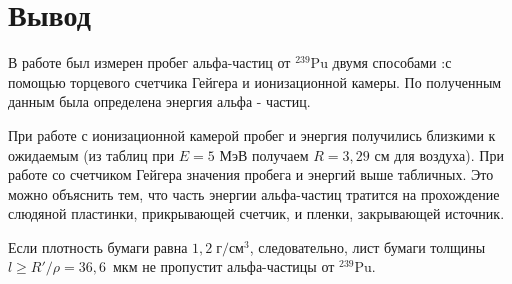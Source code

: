 \documentclass[a4paper, 12pt]{article}%
\begin{document}
\section{Вывод}
	
	В работе был измерен пробег альфа-частиц от $ ^{239}  $Pu двумя способами :с помощью торцевого счетчика Гейгера и ионизационной камеры. По полученным данным была определена энергия альфа - частиц.

	
	При работе с ионизационной камерой пробег и энергия получились близкими к ожидаемым (из таблиц при $ E = 5 $ МэВ получаем $ R = 3,29 $ см для воздуха). При работе со счетчиком Гейгера значения пробега и энергий выше табличных. Это можно объяснить тем, что часть энергии альфа-частиц тратится на прохождение слюдяной пластинки, прикрывающей счетчик, и пленки, закрывающей источник. 
	
	Если плотность бумаги равна $ 1,2 \; \text{г}/\text{см}^3 $, следовательно, лист бумаги толщины $ l \geq R'/\rho =36, 6 $~мкм не пропустит альфа-частицы от $ ^{239}  $Pu.
\end{document}
